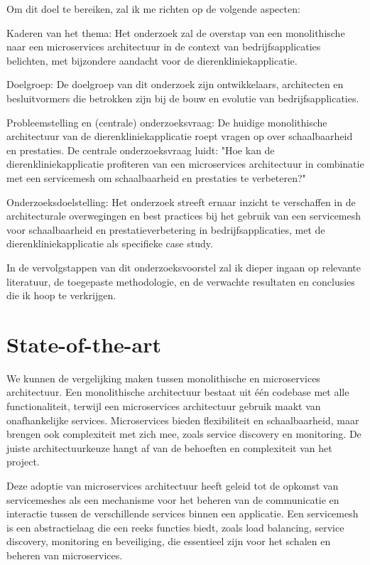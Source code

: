 Om dit doel te bereiken, zal ik me richten op de volgende aspecten:

Kaderen van het thema: Het onderzoek zal de overstap van een monolithische naar een microservices architectuur in de context van bedrijfsapplicaties belichten, met bijzondere aandacht voor de dierenkliniekapplicatie.

Doelgroep: De doelgroep van dit onderzoek zijn ontwikkelaars, architecten en besluitvormers die betrokken zijn bij de bouw en evolutie van bedrijfsapplicaties.

Probleemstelling en (centrale) onderzoeksvraag: De huidige monolithische architectuur van de dierenkliniekapplicatie roept vragen op over schaalbaarheid en prestaties. De centrale onderzoeksvraag luidt: "Hoe kan de dierenkliniekapplicatie profiteren van een microservices architectuur in combinatie met een servicemesh om schaalbaarheid en prestaties te verbeteren?"

Onderzoeksdoelstelling: Het onderzoek streeft ernaar inzicht te verschaffen in de architecturale overwegingen en best practices bij het gebruik van een servicemesh voor schaalbaarheid en prestatieverbetering in bedrijfsapplicaties, met de dierenkliniekapplicatie als specifieke case study.

In de vervolgstappen van dit onderzoeksvoorstel zal ik dieper ingaan op relevante literatuur, de toegepaste methodologie, en de verwachte resultaten en conclusies die ik hoop te verkrijgen.

\section{State-of-the-art}%
\label{sec:state-of-the-art}

We kunnen de vergelijking maken  tussen monolithische en microservices architectuur. Een monolithische architectuur bestaat uit één codebase met alle functionaliteit, terwijl een \linebreak microservices architectuur gebruik maakt van onafhankelijke services. Microservices bieden flexibiliteit en schaalbaarheid, maar brengen ook complexiteit met zich mee, zoals service discovery en monitoring. De juiste architectuurkeuze hangt af van de behoeften en complexiteit van het project.

Deze adoptie van microservices architectuur heeft geleid tot de opkomst van servicemeshes als een mechanisme voor het beheren van de communicatie en interactie tussen de verschillende services binnen een applicatie. Een servicemesh is een abstractielaag die een reeks functies biedt, zoals load balancing, service discovery, monitoring en beveiliging, die essentieel zijn voor het schalen en beheren van microservices.


